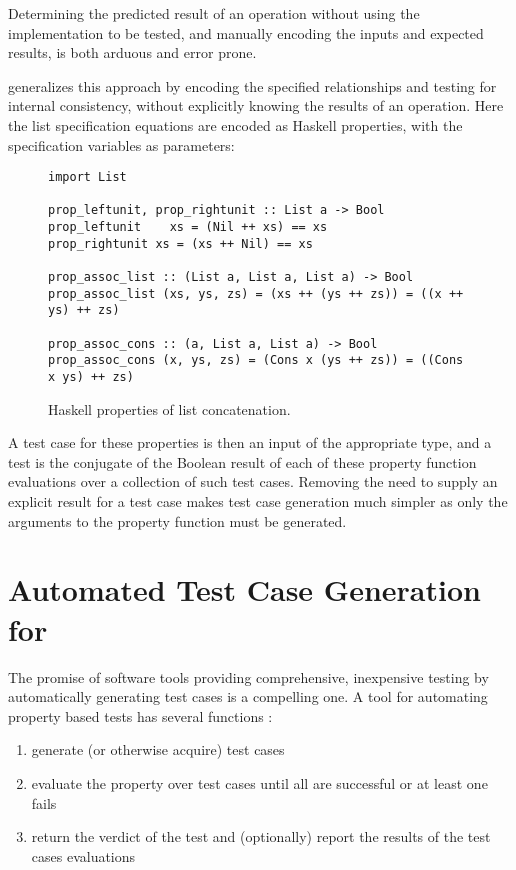 \noindent
Determining the predicted result of an operation
without using the implementation to be tested,
and manually encoding the inputs and expected results,
is both arduous and error prone.

\pbt generalizes this approach by encoding the specified relationships
and testing for internal consistency,
without explicitly knowing the results of an operation.
Here the list specification equations are encoded as Haskell properties,
with the specification variables as parameters:

\begin{figure*}
\begin{lstlisting}
import List

prop_leftunit, prop_rightunit :: List a -> Bool
prop_leftunit    xs = (Nil ++ xs) == xs
prop_rightunit xs = (xs ++ Nil) == xs

prop_assoc_list :: (List a, List a, List a) -> Bool
prop_assoc_list (xs, ys, zs) = (xs ++ (ys ++ zs)) = ((x ++ ys) ++ zs)

prop_assoc_cons :: (a, List a, List a) -> Bool
prop_assoc_cons (x, ys, zs) = (Cons x (ys ++ zs)) = ((Cons x ys) ++ zs)
\end{lstlisting}
\caption{Haskell properties of list concatenation.}
\label{intro_haskprop_ex}
\end{figure*}

\noindent
A test case for these properties is then an input of the appropriate type,
and a test is the conjugate of the Boolean result of each of these property function evaluations
over a collection of such test cases.
Removing the need to supply an explicit result for a test case
makes test case generation much simpler as only the arguments to the property function must be generated.

\section {Automated Test Case Generation for \pbt}

The promise of software tools providing comprehensive, inexpensive testing
by automatically generating test cases is a compelling one.
A tool for automating property based tests has several functions :

\begin{enumerate}
\item generate (or otherwise acquire) test cases
\item evaluate the property over test cases until all are successful or at least one fails
\item return the verdict of the test and (optionally) report the results of the test cases evaluations
\end{enumerate}

